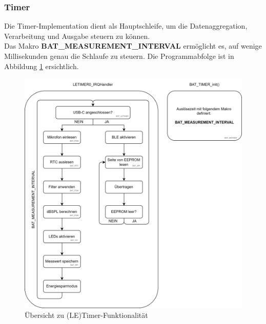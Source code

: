 \documentclass[12pt]{article}
\begin{document}
	\subsubsection*{Timer} \label{Timer}
	Die Timer-Implementation dient als Hauptschleife, um die Datenaggregation, Verarbeitung und Ausgabe steuern zu können. \\Das Makro \textbf{BAT\_MEASUREMENT\_INTERVAL} ermöglicht es, auf wenige Millisekunden genau die Schlaufe zu steuern. Die Programmabfolge ist in Abbildung \ref{fig:batsoftwareletimer} ersichtlich.
	\begin{figure}[H]
		\centering
		\includegraphics[width=1\linewidth]{images/BAT_Software_LETIMER}
		\caption{Übersicht zu (LE)Timer-Funktionalität}
		\label{fig:batsoftwareletimer}
	\end{figure}
\end{document}
